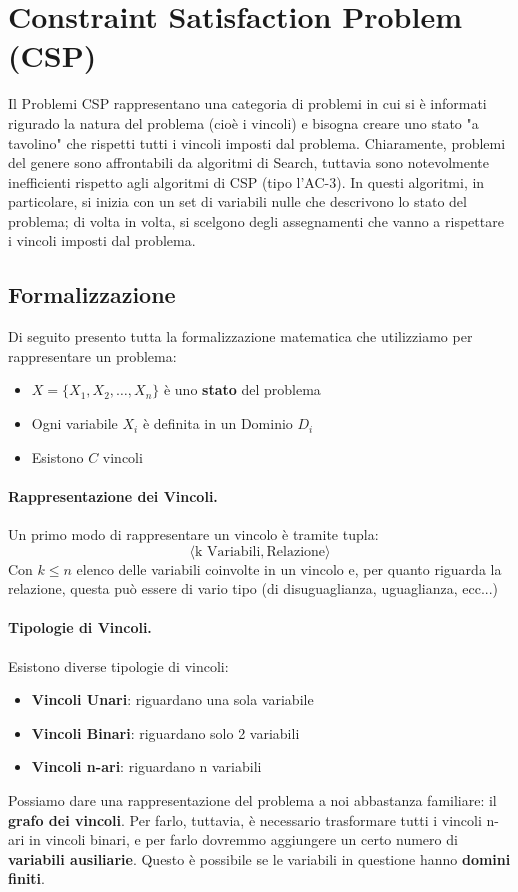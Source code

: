 \newpage

\section{Constraint Satisfaction Problem (CSP)}
Il Problemi CSP rappresentano una categoria di problemi in cui si è informati rigurado la natura del problema (cioè i vincoli)
e bisogna creare uno stato "a tavolino" che rispetti tutti i vincoli imposti dal problema. Chiaramente, problemi del genere sono 
affrontabili da algoritmi di Search, tuttavia sono notevolmente inefficienti rispetto agli algoritmi di CSP (tipo l'AC-3). In questi
algoritmi, in particolare, si inizia con un set di variabili nulle che descrivono lo stato del problema; di volta in volta, si scelgono 
degli assegnamenti che vanno a rispettare i vincoli imposti dal problema.

\subsection{Formalizzazione}
Di seguito presento tutta la formalizzazione matematica che utilizziamo per rappresentare un problema:
\begin{itemize}
    \item $X = \{X_1, X_2, \dots, X_n\}$ è uno \textbf{stato} del problema
    \item Ogni variabile $X_i$ è definita in un Dominio $D_i$
    \item Esistono $C$ vincoli
\end{itemize}
\paragraph{Rappresentazione dei Vincoli.}Un primo modo di rappresentare un vincolo è tramite tupla:
\begin{equation*}
    \langle \text{k Variabili}, \text{Relazione}\rangle 
\end{equation*}
Con $k \leq n$ elenco delle variabili coinvolte in un vincolo e, per quanto riguarda la relazione, questa può 
essere di vario tipo (di disuguaglianza, uguaglianza, ecc...)

\paragraph{Tipologie di Vincoli.}Esistono diverse tipologie di vincoli:
\begin{itemize}
    \item \textbf{Vincoli Unari}: riguardano una sola variabile
    \item \textbf{Vincoli Binari}: riguardano solo 2 variabili
    \item \textbf{Vincoli n-ari}: riguardano n variabili
\end{itemize}
Possiamo dare una rappresentazione del problema a noi abbastanza familiare: il \textbf{grafo dei vincoli}. Per
farlo, tuttavia, è necessario trasformare tutti i vincoli n-ari in vincoli binari, e per farlo dovremmo aggiungere
un certo numero di \textbf{variabili ausiliarie}. Questo è possibile se le variabili in questione hanno \textbf{domini finiti}.
